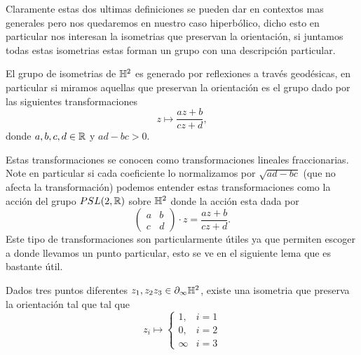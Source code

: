     Claramente estas dos ultimas definiciones se pueden dar en contextos mas generales pero nos quedaremos en nuestro caso hiperbólico, dicho esto en particular nos interesan la isometrias que preservan la orientación, si juntamos todas estas isometrias estas forman un grupo con una descripción particular.
    \begin{theorem}
        El grupo de isometrias de $\mathbb{H}^2$ es generado por reflexiones a través geodésicas, en particular si miramos aquellas que preservan la orientación es el grupo dado por las siguientes transformaciones
        $$z\mapsto\frac{az+b}{cz+d},$$
        donde $a,b,c,d\in\mathbb{R}$ y $ad-bc>0.$
    \end{theorem}
    Estas transformaciones se conocen como transformaciones lineales fraccionarias. Note en particular si cada coeficiente lo normalizamos por $\sqrt{ad-bc}$ (que no afecta la transformación) podemos entender estas transformaciones como la acción del grupo $PSL(2,\mathbb{R})$ sobre $\mathbb{H}^2$ donde la acción esta dada por
    $$\begin{pmatrix}
        a&b\\
        c&d
    \end{pmatrix}\cdot z=\frac{az+b}{cz+d}.$$
    Este tipo de transformaciones son particularmente útiles ya que permiten escoger a donde llevamos un punto particular, esto se ve en el siguiente lema que es bastante útil.
    \begin{lemma}
        Dados tres puntos diferentes $z_1,z_2z_3\in\partial_\infty\mathbb{H}^2$, existe una isometria que preserva la orientación tal que tal que 
        $$z_i\mapsto\begin{cases}
            1, & i=1\\
            0, & i=2\\
            \infty & i=3
        \end{cases}$$
    \end{lemma}
